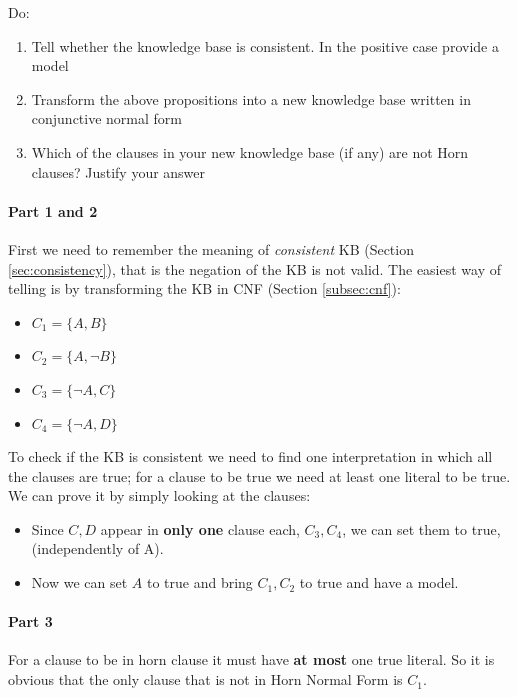 \documentclass[10pt,a4paper]{article}
\newcommand{\braces}[1]{%
  \lbrace{#1}\rbrace}
\begin{document}
Do:
\begin{enumerate}
\item Tell whether the knowledge base is consistent. In the positive case provide a model
\item Transform the above propositions into a new knowledge base written in conjunctive normal form
\item Which of the clauses in your new knowledge base (if any) are not Horn clauses? Justify your answer
\end{enumerate}


\paragraph{Part 1 and 2}
First we need to remember the meaning of \textit{consistent} KB (Section \ref{sec:consistency}), that is the negation of the KB is not valid. The easiest way of telling is by transforming the KB in CNF (Section \ref{subsec:cnf}):

\begin{itemize}
\item $C_1=\braces{A,B}$
\item $C_2=\braces{A,\neg B}$
\item $C_3=\braces{\neg A,C}$
\item $C_4=\braces{\neg A,D}$
\end{itemize}

To check if the KB is consistent we need to find one interpretation in which all the clauses are true; for a clause to be true we need at least one literal to be true. We can prove it by simply looking at the clauses:
\begin{itemize}
\item Since $C,D$ appear in \textbf{only one} clause each, $C_3,C_4$, we can set them to true, (independently of A).
\item Now we can set $A$ to true and bring $C_1,C_2$ to true and have a model.
\end{itemize}

\paragraph{Part 3}
For a clause to be in horn clause it must have \textbf{at most} one true literal. So it is obvious that the only clause that is not in Horn Normal Form is $C_1$.
\end{document}
